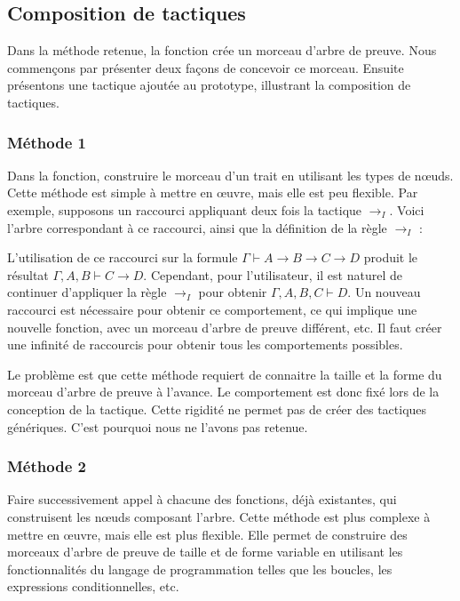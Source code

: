 \documentclass[titlepage,draft]{article}
\begin{document}
\subsection{Composition de tactiques} \label{CompositionTactiques}
Dans la méthode retenue, la fonction crée un morceau d'arbre de preuve.
Nous commençons par présenter deux façons de concevoir ce morceau. Ensuite présentons une tactique ajoutée au prototype, illustrant la composition de tactiques.

\subsubsection{Méthode 1}
Dans la fonction, construire le morceau d'un trait en utilisant les types de nœuds. Cette méthode est simple à mettre en œuvre, mais elle est peu flexible. Par exemple, supposons un raccourci appliquant deux fois la tactique $\to_I$. Voici l'arbre correspondant à ce raccourci, ainsi que la définition de la règle $\to_I$ :

L'utilisation de ce raccourci sur la formule $\Gamma \vdash A \to B \to C \to D$ produit le résultat $\Gamma, A, B \vdash C \to D$. Cependant, pour l'utilisateur, il est naturel de continuer d'appliquer la règle $\to_I$ pour obtenir $\Gamma, A, B, C \vdash D$. Un nouveau raccourci est nécessaire pour obtenir ce comportement, ce qui implique une nouvelle fonction, avec un morceau d'arbre de preuve différent, etc. Il faut créer une infinité de raccourcis pour obtenir tous les comportements possibles.

Le problème est que cette méthode requiert de connaitre la taille et la forme du morceau d'arbre de preuve à l'avance. Le comportement est donc fixé lors de la conception de la tactique. Cette rigidité ne permet pas de créer des tactiques génériques. C'est pourquoi nous ne l'avons pas retenue.

\subsubsection{Méthode 2} Faire successivement appel à chacune des fonctions, déjà existantes, qui construisent les nœuds composant l'arbre. Cette méthode est plus complexe à mettre en œuvre, mais elle est plus flexible. Elle permet de construire des morceaux d'arbre de preuve de taille et de forme variable en utilisant les fonctionnalités du langage de programmation telles que les boucles, les expressions conditionnelles, etc.
\end{document}
